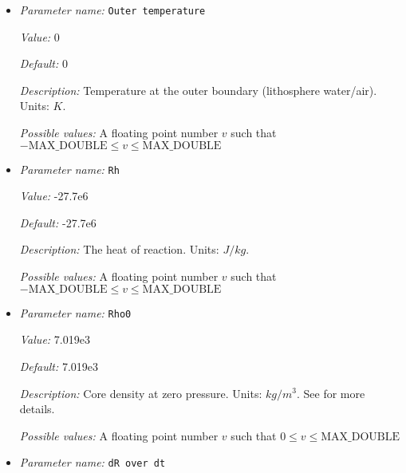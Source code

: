 \begin{itemize}
{\it Value:} 30000


{\it Default:} 30000


{\it Description:} The max iterations for nonliner core energy solver.


{\it Possible values:} An integer $n$ such that $0\leq n \leq 2147483647$
\item {\it Parameter name:} {\tt Outer temperature}
\label{parameters:Boundary temperature model/Dynamic core/Outer temperature}


{\it Value:} 0


{\it Default:} 0


{\it Description:} Temperature at the outer boundary (lithosphere water/air). Units: $K$.


{\it Possible values:} A floating point number $v$ such that $-\text{MAX\_DOUBLE} \leq v \leq \text{MAX\_DOUBLE}$
\item {\it Parameter name:} {\tt Rh}
\label{parameters:Boundary temperature model/Dynamic core/Rh}


{\it Value:} -27.7e6


{\it Default:} -27.7e6


{\it Description:} The heat of reaction. Units: $J/kg$.


{\it Possible values:} A floating point number $v$ such that $-\text{MAX\_DOUBLE} \leq v \leq \text{MAX\_DOUBLE}$
\item {\it Parameter name:} {\tt Rho0}
\label{parameters:Boundary temperature model/Dynamic core/Rho0}


{\it Value:} 7.019e3


{\it Default:} 7.019e3


{\it Description:} Core density at zero pressure. Units: $kg/m^3$. See \cite{NPB+04} for more details.


{\it Possible values:} A floating point number $v$ such that $0 \leq v \leq \text{MAX\_DOUBLE}$
\item {\it Parameter name:} {\tt dR over dt}
\label{parameters:Boundary temperature model/Dynamic core/dR over dt}



\end{itemize}
